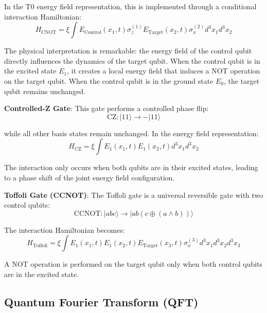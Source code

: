 \documentclass[12pt,a4paper]{article}
\newcommand{\xipar}{\xi}
\theoremstyle{definition}
\theoremstyle{remark}
\begin{document}
	In the T0 energy field representation, this is implemented through a conditional interaction Hamiltonian:
	\begin{equation}
		H_{\text{CNOT}} = \xipar \int E_{\text{Control}}(x_1,t) \sigma_z^{(1)} E_{\text{Target}}(x_2,t) \sigma_x^{(2)} d^3x_1 d^3x_2
		\label{eq:cnot_hamiltonian_detailed}
	\end{equation}
	
	The physical interpretation is remarkable: the energy field of the control qubit directly influences the dynamics of the target qubit. When the control qubit is in the excited state $E_1$, it creates a local energy field that induces a NOT operation on the target qubit. When the control qubit is in the ground state $E_0$, the target qubit remains unchanged.
	
	\textbf{Controlled-Z Gate}:
	This gate performs a controlled phase flip:
	\begin{equation}
		\text{CZ}: |11\rangle \rightarrow -|11\rangle
	\end{equation}
	
	while all other basis states remain unchanged. In the energy field representation:
	\begin{equation}
		H_{\text{CZ}} = \xipar \int E_1(x_1,t) E_1(x_2,t) d^3x_1 d^3x_2
	\end{equation}
	
	The interaction only occurs when both qubits are in their excited states, leading to a phase shift of the joint energy field configuration.
	
	\textbf{Toffoli Gate (CCNOT)}:
	The Toffoli gate is a universal reversible gate with two control qubits:
	\begin{equation}
		\text{CCNOT}: |abc\rangle \rightarrow |ab(c \oplus (a \land b))\rangle
	\end{equation}
	
	The interaction Hamiltonian becomes:
	\begin{equation}
		H_{\text{Toffoli}} = \xipar \int E_1(x_1,t) E_1(x_2,t) E_{\text{Target}}(x_3,t) \sigma_x^{(3)} d^3x_1 d^3x_2 d^3x_3
	\end{equation}
	
	A NOT operation is performed on the target qubit only when both control qubits are in the excited state.
	
	\subsection{Quantum Fourier Transform (QFT)}
	
\end{document}
